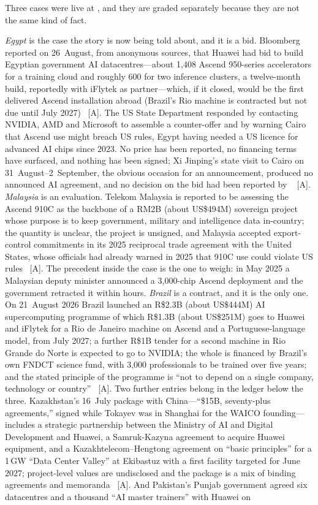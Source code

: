 Three cases were live at \datafreeze, and they are graded separately because they are not the same kind of fact.

\emph{Egypt} is the case the story is now being told about, and it is a bid. Bloomberg reported on 26~August, from anonymous sources, that Huawei had bid to build Egyptian government AI datacentres---about 1{,}408 Ascend 950-series accelerators for a training cloud and roughly 600 for two inference clusters, a twelve-month build, reportedly with iFlytek as partner---which, if it closed, would be the first delivered Ascend installation abroad (Brazil's Rio machine is contracted but not due until July 2027)~\cite{huawei-egypt} [A]. The US State Department responded by contacting NVIDIA, AMD and Microsoft to assemble a counter-offer and by warning Cairo that Ascend use might breach US rules, Egypt having needed a US licence for advanced AI chips since 2023. No price has been reported, no financing terms have surfaced, and nothing has been signed; Xi Jinping's state visit to Cairo on 31~August--2~September, the obvious occasion for an announcement, produced no announced AI agreement, and no decision on the bid had been reported by \datafreeze~\cite{huawei-egypt} [A]. \emph{Malaysia} is an evaluation. Telekom Malaysia is reported to be assessing the Ascend 910C as the backbone of a RM2B (about US\$494M) sovereign project whose purpose is to keep government, military and intelligence data in-country; the quantity is unclear, the project is unsigned, and Malaysia accepted export-control commitments in its 2025 reciprocal trade agreement with the United States, whose officials had already warned in 2025 that 910C use could violate US rules~\cite{huawei-malaysia} [A]. The precedent inside the case is the one to weigh: in May 2025 a Malaysian deputy minister announced a 3{,}000-chip Ascend deployment and the government retracted it within hours. \emph{Brazil} is a contract, and it is the only one. On 21~August 2026 Brazil launched an R\$2.3B (about US\$444M) AI supercomputing programme of which R\$1.3B (about US\$251M) goes to Huawei and iFlytek for a Rio de Janeiro machine on Ascend and a Portuguese-language model, from July 2027; a further R\$1B tender for a second machine in Rio Grande do Norte is expected to go to NVIDIA; the whole is financed by Brazil's own FNDCT science fund, with 3{,}000 professionals to be trained over five years; and the stated principle of the programme is ``not to depend on a single company, technology or country''~\cite{brazil-ai-supercomputer} [A]. Two further entries belong in the ledger below the three. Kazakhstan's 16~July package with China---``\$15B, seventy-plus agreements,'' signed while Tokayev was in Shanghai for the WAICO founding---includes a strategic partnership between the Ministry of AI and Digital Development and Huawei, a Samruk-Kazyna agreement to acquire Huawei equipment, and a Kazakhtelecom--Hengtong agreement on ``basic principles'' for a 1\,GW ``Data Center Valley'' at Ekibastuz with a first facility targeted for June 2027; project-level values are undisclosed and the package is a mix of binding agreements and memoranda~\cite{kazakh-huawei} [A]. And Pakistan's Punjab government agreed six datacentres and a thousand ``AI master trainers'' with Huawei on 